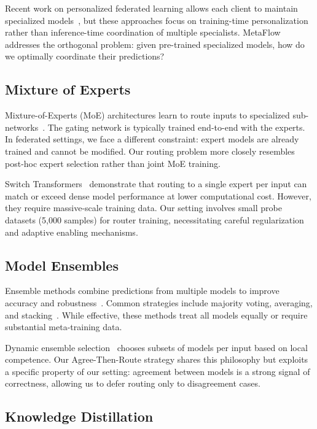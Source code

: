 \documentclass[12pt]{article}
\begin{document}
Recent work on personalized federated learning allows each client to maintain specialized models~\cite{fallah2020personalized, tan2022towards}, but these approaches focus on training-time personalization rather than inference-time coordination of multiple specialists. MetaFlow addresses the orthogonal problem: given pre-trained specialized models, how do we optimally coordinate their predictions?

\subsection{Mixture of Experts}

Mixture-of-Experts (MoE) architectures learn to route inputs to specialized sub-networks~\cite{jacobs1991adaptive, shazeer2017outrageously}. The gating network is typically trained end-to-end with the experts. In federated settings, we face a different constraint: expert models are already trained and cannot be modified. Our routing problem more closely resembles post-hoc expert selection rather than joint MoE training.

Switch Transformers~\cite{fedus2021switch} demonstrate that routing to a single expert per input can match or exceed dense model performance at lower computational cost. However, they require massive-scale training data. Our setting involves small probe datasets (5,000 samples) for router training, necessitating careful regularization and adaptive enabling mechanisms.

\subsection{Model Ensembles}

Ensemble methods combine predictions from multiple models to improve accuracy and robustness~\cite{dietterich2000ensemble}. Common strategies include majority voting, averaging, and stacking~\cite{wolpert1992stacked}. While effective, these methods treat all models equally or require substantial meta-training data.

Dynamic ensemble selection~\cite{woods1997combination, cruz2018dynamic} chooses subsets of models per input based on local competence. Our Agree-Then-Route strategy shares this philosophy but exploits a specific property of our setting: agreement between models is a strong signal of correctness, allowing us to defer routing only to disagreement cases.

\subsection{Knowledge Distillation}
\end{document}
